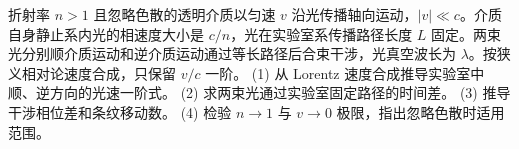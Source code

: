 折射率 \(n>1\) 且忽略色散的透明介质以匀速 \(v\) 沿光传播轴向运动，\(|v|\ll c\)。介质自身静止系内光的相速度大小是 \(c/n\)，光在实验室系传播路径长度 \(L\) 固定。两束光分别顺介质运动和逆介质运动通过等长路径后合束干涉，光真空波长为 \(\lambda\)。按狭义相对论速度合成，只保留 \(v/c\) 一阶。
(1) 从 Lorentz 速度合成推导实验室中顺、逆方向的光速一阶式。
(2) 求两束光通过实验室固定路径的时间差。
(3) 推导干涉相位差和条纹移动数。
(4) 检验 \(n\to1\) 与 \(v\to0\) 极限，指出忽略色散时适用范围。
